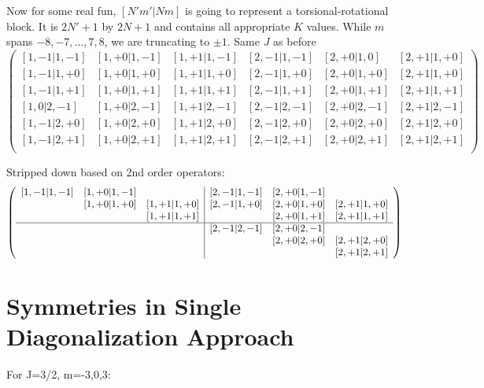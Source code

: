 \documentclass{article}
\begin{document}
Now for some real fun, $[N'm'|Nm]$ is going to represent a torsional-rotational block. It is $2N'+1$ by $2N+1$ and contains all appropriate $K$ values. While $m$ spans $-8,-7,...,7,8$, we are truncating to $\pm1$. Same $J$ as before
\[
\left(
\begin{array}{ccc|ccc}
\left[1,-1|1,-1\right] & \left[1,+0|1,-1\right] & \left[1,+1|1,-1\right] & \left[2,-1|1,-1\right] & \left[2,+0|1,0\right] & \left[2,+1|1,+0\right] \\
\left[1,-1|1,+0\right] & \left[1,+0|1,+0\right] & \left[1,+1|1,+0\right] & \left[2,-1|1,+0\right] & \left[2,+0|1,+0\right] & \left[2,+1|1,+0\right] \\
\left[1,-1|1,+1\right] & \left[1,+0|1,+1\right] & \left[1,+1|1,+1\right] & \left[2,-1|1,+1\right] & \left[2,+0|1,+1\right] & \left[2,+1|1,+1\right] \\
\hline
\left[1,0|2,-1\right] & \left[1,+0|2,-1\right] & \left[1,+1|2,-1\right] & \left[2,-1|2,-1\right] & \left[2,+0|2,-1\right] & \left[2,+1|2,-1\right] \\
\left[1,-1|2,+0\right] & \left[1,+0|2,+0\right] & \left[1,+1|2,+0\right] & \left[2,-1|2,+0\right] & \left[2,+0|2,+0\right] & \left[2,+1|2,+0\right] \\
\left[1,-1|2,+1\right] & \left[1,+0|2,+1\right] & \left[1,+1|2,+1\right] & \left[2,-1|2,+1\right] & \left[2,+0|2,+1\right] & \left[2,+1|2,+1\right] \\
\end{array}
\right)
\]

Stripped down based on 2nd order operators:
\[
\left(
\begin{array}{ccc|ccc}
\left[1,-1|1,-1\right] & \left[1,+0|1,-1\right] &  & \left[2,-1|1,-1\right] & \left[2,+0|1,-1\right] & \\
& \left[1,+0|1,+0\right] & \left[1,+1|1,+0\right] & \left[2,-1|1,+0\right] & \left[2,+0|1,+0\right] & \left[2,+1|1,+0\right] \\
& & \left[1,+1|1,+1\right] &  & \left[2,+0|1,+1\right] & \left[2,+1|1,+1\right] \\
\hline
& & & \left[2,-1|2,-1\right] & \left[2,+0|2,-1\right] & \\
& & & & \left[2,+0|2,+0\right] & \left[2,+1|2,+0\right] \\
& & & & & \left[2,+1|2,+1\right] \\
\end{array}
\right)
\]


\newpage

\section{Symmetries in Single Diagonalization Approach}
For J=3/2, m=-3,0,3:
\end{document}
